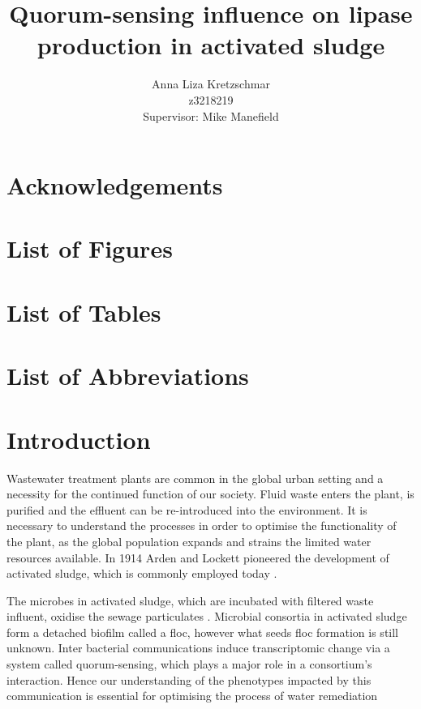 \documentclass{article}
\title{\textbf{Quorum-sensing influence on lipase production in activated sludge}}
\author{Anna Liza Kretzschmar\\
        z3218219\\
        Supervisor: Mike Manefield}
\date{}
\begin{document}
\maketitle

\tableofcontents

\newpage


\section{Acknowledgements}

\newpage
\section{List of Figures}

\listoffigures

\newpage

\section{List of Tables}

\listoftables

\newpage
\section{List of Abbreviations}

\newpage
\section{Introduction}
Wastewater treatment plants are common in the global urban setting and a necessity for the continued function of our society. Fluid waste enters the plant, is purified and the effluent can be re-introduced into the environment. It is necessary to understand the processes in order to optimise the functionality of the plant, as the global population expands and strains the limited water resources available. In 1914 Arden and Lockett pioneered the development of activated sludge, which is commonly employed today \cite{ardern1914experiments}.


The microbes in activated sludge, which are incubated with filtered waste influent, oxidise the sewage particulates \cite{Price_95}. Microbial consortia in activated sludge form a detached biofilm called a floc, however what seeds floc formation is still unknown. Inter bacterial communications induce transcriptomic change via a system called quorum-sensing, which plays a major role in a consortium's interaction\cite{parsek2005sociomicrobiology}. Hence our understanding of the phenotypes impacted by this communication is essential for optimising the process of water remediation \cite{singh2006biofilms}
\end{document}
